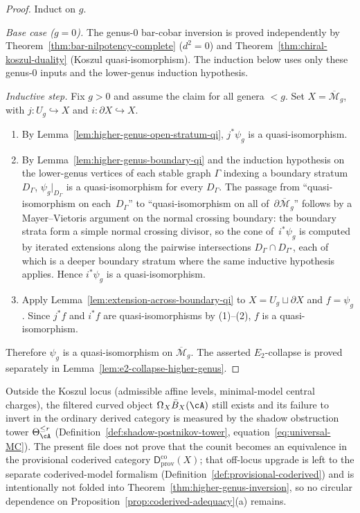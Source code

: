 \begin{proof}
Induct on $g$.

\emph{Base case ($g=0$).}
The genus-$0$ bar-cobar inversion is proved independently by
Theorem~\ref{thm:bar-nilpotency-complete} ($d^2 = 0$) and
Theorem~\ref{thm:chiral-koszul-duality} (Koszul quasi-isomorphism).
The induction below uses only these genus-$0$ inputs and the
lower-genus induction hypothesis.

\emph{Inductive step.}
Fix $g>0$ and assume the claim for all genera $<g$. Set
$X=\overline{\mathcal{M}}_g$, with $j:U_g\hookrightarrow X$ and
$i:\partial X\hookrightarrow X$.
\begin{enumerate}[label=(\arabic*)]
\item By Lemma~\ref{lem:higher-genus-open-stratum-qi}, $j^*\psi_g$ is a
quasi-isomorphism.
\item By Lemma~\ref{lem:higher-genus-boundary-qi} and the induction hypothesis
on the lower-genus vertices of each stable graph $\Gamma$ indexing a boundary
stratum $D_\Gamma$, $\psi_g|_{D_\Gamma}$ is a quasi-isomorphism for every
$D_\Gamma$. The passage from ``quasi-isomorphism on each~$D_\Gamma$''
to ``quasi-isomorphism on all of~$\partial\overline{\mathcal{M}}_g$''
follows by a Mayer--Vietoris argument on the normal crossing boundary:
the boundary strata form a simple normal crossing divisor, so the
cone of~$i^*\psi_g$ is computed by iterated extensions along the
pairwise intersections $D_\Gamma \cap D_{\Gamma'}$, each of which
is a deeper boundary stratum where the same inductive hypothesis
applies. Hence $i^*\psi_g$ is a quasi-isomorphism.
\item Apply Lemma~\ref{lem:extension-across-boundary-qi} to
$X=U_g\sqcup\partial X$ and $f=\psi_g$. Since $j^*f$ and $i^*f$ are
quasi-isomorphisms by (1)--(2), $f$ is a quasi-isomorphism.
\end{enumerate}
Therefore $\psi_g$ is a quasi-isomorphism on $\overline{\mathcal{M}}_g$.
The asserted $E_2$-collapse is proved separately in
Lemma~\ref{lem:e2-collapse-higher-genus}.
\end{proof}

\begin{remark}
Outside the Koszul locus \textup{(}admissible affine levels,
minimal-model central charges\textup{)}, the filtered curved object
$\Omega_X \bar{B}_X(\cA)$ still exists and its failure to invert in the
ordinary derived category is measured by the shadow obstruction tower
$\Theta_{\cA}^{\leq r}$
\textup{(}Definition~\textup{\ref{def:shadow-postnikov-tower},}
equation~\eqref{eq:universal-MC}\textup{)}. The present file does not
prove that the counit becomes an equivalence in the provisional
coderived category
$\mathsf{D}^{\mathrm{co}}_{\mathrm{prov}}(X)$; that off-locus upgrade is
left to the separate coderived-model formalism
\textup{(}Definition~\textup{\ref{def:provisional-coderived}}\textup{)}
and is intentionally not folded into
Theorem~\ref{thm:higher-genus-inversion}, so no circular dependence on
Proposition~\ref{prop:coderived-adequacy}(a) remains.
\end{remark}

